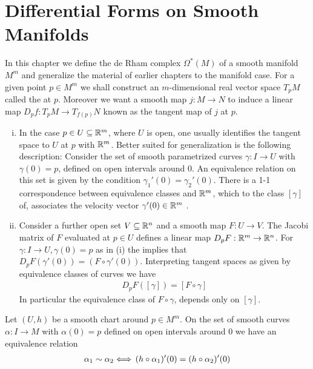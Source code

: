 \chapter{Differential Forms on Smooth Manifolds}
In this chapter we define the de Rham complex $\Omega^*(M)$ of a smooth manifold $M^m$
and generalize the material of earlier chapters to the manifold case.
For a given point $p\in M^m$ we shall construct an $m$-dimensional real 
vector space $T_pM$ called the  at $p$. Moreover we want a smooth 
map $j:M\to N$ to induce a linear map $D_pf:T_pM\to T_{f(p)}N$ known as the tangent 
map of $j$ at $p$.

\begin{remark}\label{remark:9-1}
  \begin{enumerate}[(i)]
    \item In the case $p\in U\subseteq{\ensuremath{\mathbb{R}}}^m$, where $U$ is open, one usually identifies the
      tangent space to $U$ at $p$ with ${\mathbb{R}}^m$. Better suited for generalization is the
      following description: Consider the set of smooth parametrized curves
      $\gamma:I\to U$ with $\gamma(0)=p$, defined on open intervals around 0.
      An equivalence relation on this set is given by the condition $\gamma_1'(0) = \gamma_2'(0)$.
      There is a 1-1 correspondence between equivalence classes and ${\mathbb{R}}^m$, which
      to the class $[\gamma]$ of, associates the velocity vector $\gamma'(0)\in{\ensuremath{\mathbb{R}}}^m$ .
    \item Consider a further open set $V\subseteq{\ensuremath{\mathbb{R}}}^n$ and a smooth map $F:U\to V$. The Jacobi 
      matrix of $F$ evaluated at $p\in U$ defines a linear map $D_pF:{\mathbb{R}}^m\to{\ensuremath{\mathbb{R}}}^n$. For $\gamma:I\to U,
      \gamma(0)= p$ as in (i) the  implies that $D_pF(\gamma'(0)) = (F\circ \gamma'(0))$. Interpreting 
      tangent spaces as given by equivalence classes of curves we have
      \begin{align}\label{eq:9-1}
        D_pF([\gamma]) = [F\circ \gamma]
      \end{align}
      In particular the equivalence class of $F\circ\gamma$, depends only on $[\gamma]$.
  \end{enumerate}
\end{remark}

Let $(U, h)$ be a smooth chart around $p\in M^m$. On the set of smooth curves
$\alpha:I\to M$ with $\alpha(0) = p$ defined on open intervals around 0 we have an 
equivalence relation
\begin{align}\label{eq:9-2}
  \alpha_1 \sim \alpha_2 
  \Longleftrightarrow\, (h\circ\alpha_1)'(0) = (h\circ\alpha_2)'(0)
\end{align}

